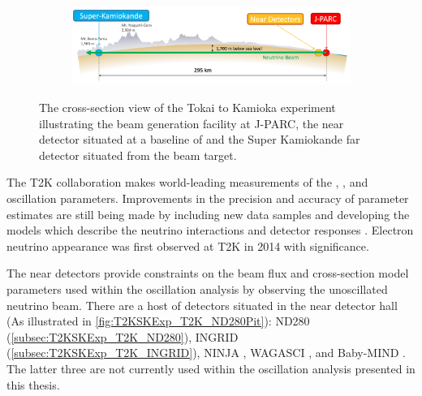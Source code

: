 \begin{figure}[h]
  \begin{subfigure}[t]{0.95\textwidth}
    \includegraphics[width=\textwidth, trim={0mm 0mm 0mm 0mm}, clip,page=1]{Figures/Detectors/T2KCrossSection.pdf}
  \end{subfigure}
  \caption{The cross-section view of the Tokai to Kamioka experiment illustrating the beam generation facility at J-PARC, the near detector situated at a baseline of  and the Super Kamiokande far detector situated  from the beam target.}
  \label{fig:T2KSKExp_T2K_Overview}
\end{figure}

The T2K collaboration makes world-leading measurements of the , , and  oscillation parameters. Improvements in the precision and accuracy of parameter estimates are still being made by including new data samples and developing the models which describe the neutrino interactions and detector responses \cite{Bronner2022-wd}. Electron neutrino appearance was first observed at T2K in 2014 \cite{2014_Abe_ElectronNuApp} with \quickmath{7.3\sigma} significance.

The near detectors provide constraints on the beam flux and cross-section model parameters used within the oscillation analysis by observing the unoscillated neutrino beam. There are a host of detectors situated in the near detector hall (As illustrated in \autoref{fig:T2KSKExp_T2K_ND280Pit}): ND280 (\autoref{subsec:T2KSKExp_T2K_ND280}), INGRID (\autoref{subsec:T2KSKExp_T2K_INGRID}), NINJA \cite{ninja}, WAGASCI \cite{wagasci}, and Baby-MIND \cite{baby_mind}. The latter three are not currently used within the oscillation analysis presented in this thesis.

